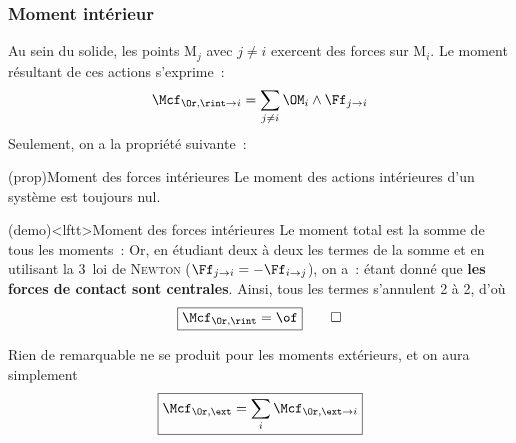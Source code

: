 \documentclass[../../main/main.tex]{subfiles}
\begin{document}
\subsubsection{Moment intérieur}
Au sein du solide, les points M$_j$ avec $j\neq i$ exercent des forces sur
M$_i$. Le moment résultant de ces actions s'exprime~:
\[\Mcf_{\Or, \rint\to i} = \sum_{j\neq i} \OM_i\wedge \Ff_{j\to i}\]
Seulement, on a la propriété suivante~:
\begin{tcb*}(prop){Moment des forces intérieures}
	Le moment des actions intérieures d'un système est toujours nul.
\end{tcb*}
\begin{tcb*}[breakable](demo)<lftt>{Moment des forces intérieures}
	Le moment total est la somme de tous les moments~:
	Or, en étudiant deux à deux les termes de la somme et en utilisant la 3\ieme\
	loi de \textsc{Newton} ($\Ff_{j\to i} = -\Ff_{i\to j}$), on a~:
	étant donné que \textbf{les forces de contact sont centrales}. Ainsi, tous les
	termes s'annulent 2 à 2, d'où
	\begin{gather*}
		\boxed{\Mcf_{\Or, \rint} = \of}
		\qed
	\end{gather*}
\end{tcb*}
Rien de remarquable ne se produit pour les moments extérieurs, et on aura
simplement
\[
	\boxed{\Mcf_{\Or,\ext} = \sum_i \Mcf_{\Or,\ext\to i}}
\]
\end{document}
